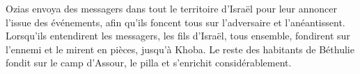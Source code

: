 Ozias envoya des messagers dans tout le territoire d’Israël
		pour leur annoncer l’issue des événements,
	afin qu’ils foncent tous sur l’adversaire et l’anéantissent.
Lorsqu’ils entendirent les messagers,
	les fils d’Israël, tous ensemble, fondirent sur l’ennemi
	et le mirent en pièces, jusqu’à Khoba.
Le reste des habitants de Béthulie fondit sur le camp d’Assour,
	le pilla et s’enrichit considérablement.
